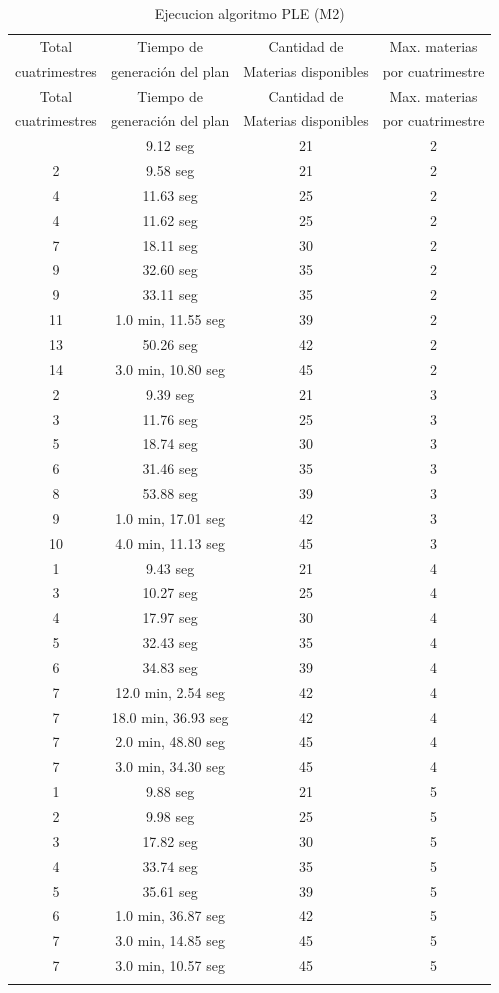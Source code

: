 \documentclass[a4paper]{article}
\begin{document}
\begin{longtable}{| c | c | c | c |}
\hline
Total   & Tiempo de & Cantidad de & Max. materias  \\
cuatrimestres &  generación del plan &  Materias disponibles & por cuatrimestre \\
\hline \hline
\endfirsthead
\hline
Total   & Tiempo de & Cantidad de & Max. materias  \\
cuatrimestres &  generación del plan &  Materias disponibles & por cuatrimestre \\
\hline \hline
\endhead
\endfoot
\endlastfoot
2 & 9.12 seg & 21 & 2\\
\hline
2 & 9.58 seg & 21 & 2\\
\hline
4 & 11.63 seg & 25 & 2\\
\hline
4 & 11.62 seg & 25 & 2\\
\hline
7 & 18.11 seg & 30 & 2\\
\hline
9 & 32.60 seg & 35 & 2\\
\hline
9 & 33.11 seg & 35 & 2\\
\hline
11 & 1.0 min, 11.55 seg & 39 & 2\\
\hline
13 & 50.26 seg & 42 & 2\\
\hline
14 & 3.0 min, 10.80 seg & 45 & 2\\
\hline
2 & 9.39 seg & 21 & 3\\
\hline
3 & 11.76 seg & 25 & 3\\
\hline
5 & 18.74 seg & 30 & 3\\
\hline
6 & 31.46 seg & 35 & 3\\
\hline
8 & 53.88 seg & 39 & 3\\
\hline
9 & 1.0 min, 17.01 seg & 42 & 3\\
\hline
10 & 4.0 min, 11.13 seg & 45 & 3\\
\hline
1 & 9.43 seg & 21 & 4\\
\hline
3 & 10.27 seg & 25 & 4\\
\hline
4 & 17.97 seg & 30 & 4\\
\hline
5 & 32.43 seg & 35 & 4\\
\hline
6 & 34.83 seg & 39 & 4\\
\hline
7 & 12.0 min, 2.54 seg & 42 & 4\\
\hline
7 & 18.0 min, 36.93 seg & 42 & 4\\
\hline
7 & 2.0 min, 48.80 seg & 45 & 4\\
\hline
7 & 3.0 min, 34.30 seg & 45 & 4\\
\hline
1 & 9.88 seg & 21 & 5\\
\hline
2 & 9.98 seg & 25 & 5\\
\hline
3 & 17.82 seg & 30 & 5\\
\hline
4 & 33.74 seg & 35 & 5\\
\hline
5 & 35.61 seg & 39 & 5\\
\hline
6 & 1.0 min, 36.87 seg & 42 & 5\\
\hline
7 & 3.0 min, 14.85 seg & 45 & 5\\
\hline
7 & 3.0 min, 10.57 seg & 45 & 5\\
\hline
\caption{Ejecucion algoritmo PLE (M2)}
\end{longtable}
\end{document}
